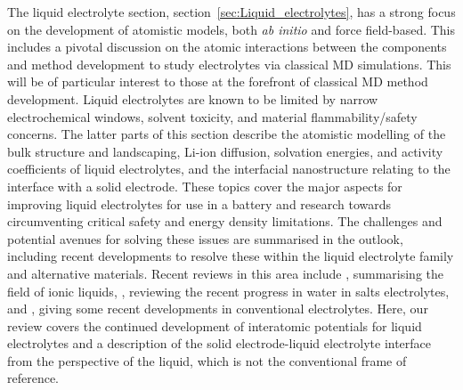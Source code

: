 \documentclass[../main.tex]{subfiles}
\begin{document}
The liquid electrolyte section, section~\ref{sec:Liquid_electrolytes}, has a strong focus on the development of atomistic models, both \textit{ab initio} and force field-based. This includes a pivotal discussion on the atomic interactions between the components and method development to study electrolytes via classical MD simulations. This will be of particular interest to those at the forefront of classical MD method development. Liquid electrolytes are known to be limited by narrow electrochemical windows, solvent toxicity, and material flammability/safety concerns. The latter parts of this section describe the atomistic modelling of the bulk structure and landscaping, Li-ion diffusion, solvation energies, and activity coefficients of liquid electrolytes, and the interfacial nanostructure relating to the interface with a solid electrode. These topics cover the major aspects for improving liquid electrolytes for use in a battery and research towards circumventing critical safety\cite{Shepherd_Siddiqui, Pfrang2017} and energy density\cite{Liu2019_e_den} limitations. The challenges and potential avenues for solving these issues are summarised in the outlook, including recent developments to resolve these within the liquid electrolyte family and alternative materials. Recent reviews in this area include \citeauthor{galinski2006ionic},\cite{galinski2006ionic} summarising the field of ionic liquids, \citeauthor{wang2020recent},\cite{wang2020recent} reviewing the recent progress in water in salts electrolytes, and \citeauthor{Logan2020},\cite{Logan2020} giving some recent developments in conventional electrolytes. Here, our review covers the continued development of interatomic potentials for liquid electrolytes and a description of the solid electrode-liquid electrolyte interface from the perspective of the liquid, which is not the conventional frame of reference.
\end{document}
